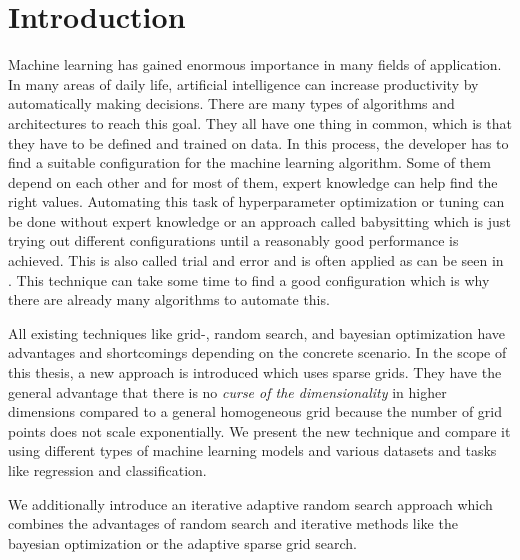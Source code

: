 
\chapter{Introduction}\label{chapter:introduction}

Machine learning has gained enormous importance in many fields of application. In many areas of daily life, artificial intelligence can increase productivity by automatically making decisions. There are many types of algorithms and architectures to reach this goal. They all have one thing in common, which is that they have to be defined and trained on data. In this process, the developer has to find a suitable configuration for the machine learning algorithm. Some of them depend on each other and for most of them, expert knowledge can help find the right values. Automating this task of hyperparameter optimization or tuning can be done without expert knowledge or an approach called babysitting which is just trying out different configurations until a reasonably good performance is achieved. This is also called trial and error and is often applied as can be seen in \cite{MALAKOUTI2023200248, gorgolis2019hyperparameter}. This technique can take some time to find a good configuration which is why there are already many algorithms to automate this. \newline 

All existing techniques like grid-, random search, and bayesian optimization have advantages and shortcomings depending on the concrete scenario. In the scope of this thesis, a new approach is introduced which uses sparse grids. They have the general advantage that there is no \textit{curse of the dimensionality} in higher dimensions compared to a general homogeneous grid because the number of grid points does not scale exponentially. We present the new technique and compare it using different types of machine learning models and various datasets and tasks like regression and classification. \newline 

We additionally introduce an iterative adaptive random search approach which combines the advantages of random search and iterative methods like the bayesian optimization or the adaptive sparse grid search. \newline 

